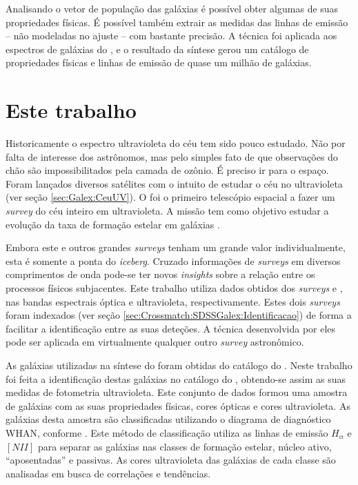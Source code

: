 Analisando o vetor de população das galáxias é possível obter algumas de suas
propriedades físicas. É possível também extrair as medidas das linhas de emissão
-- não modeladas no ajuste -- com bastante precisão. A técnica foi aplicada aos
espectros de galáxias do \SDSS, e o resultado da síntese gerou um catálogo de
propriedades físicas e linhas de emissão de quase um milhão de galáxias.



\section{Este trabalho}
\label{sec:Intro:EsteTrab}

Historicamente o espectro ultravioleta do céu tem sido pouco estudado. Não por
falta de interesse dos astrônomos, mas pelo simples fato de que observações do
chão são impossibilitados pela camada de ozônio. É preciso ir para o espaço.
Foram lançados diversos satélites com o intuito de estudar o céu no ultravioleta
(ver seção \ref{sec:Galex:CeuUV}). O \galex foi o primeiro telescópio espacial a
fazer um {\em survey} do céu inteiro em ultravioleta. A missão tem como objetivo
estudar a evolução da taxa de formação estelar em galáxias \citep{Martin2005}.

Embora este e outros grandes {\em surveys} tenham um grande valor
individualmente, esta é somente a ponta do {\em iceberg}. Cruzado informações de
{\em surveys} em diversos comprimentos de onda pode-se ter novos {\em insights}
sobre a relação entre os processos físicos subjacentes. Este trabalho utiliza
dados obtidos dos {\em surveys} \SDSS e \galex, nas bandas espectrais óptica e
ultravioleta, respectivamente. Estes dois {\em surveys} foram indexados (ver
seção \ref{sec:Crossmatch:SDSSGalex:Identificacao}) de forma a facilitar a
identificação entre as suas deteções. A técnica desenvolvida por eles pode ser
aplicada em virtualmente qualquer outro {\em survey} astronômico.

As galáxias utilizadas na síntese do \starlight foram obtidas do catálogo do
\SDSS. Neste trabalho foi feita a identificação destas galáxias no catálogo do
\galex, obtendo-se assim as suas medidas de fotometria ultravioleta. Este
conjunto de dados formou uma amostra de galáxias com as suas propriedades
físicas, cores ópticas e cores ultravioleta. As galáxias desta amostra são
classificadas utilizando o diagrama de diagnóstico WHAN, conforme
\citet{CidFernandes2011}. Este método de classificação utiliza as linhas de
emissão $H_\alpha$ e $[NII]$ para separar as galáxias nas classes de formação
estelar, núcleo ativo, ``aposentadas'' e passivas. As cores ultravioleta das
galáxias de cada classe são analisadas em busca de correlações e tendências.

